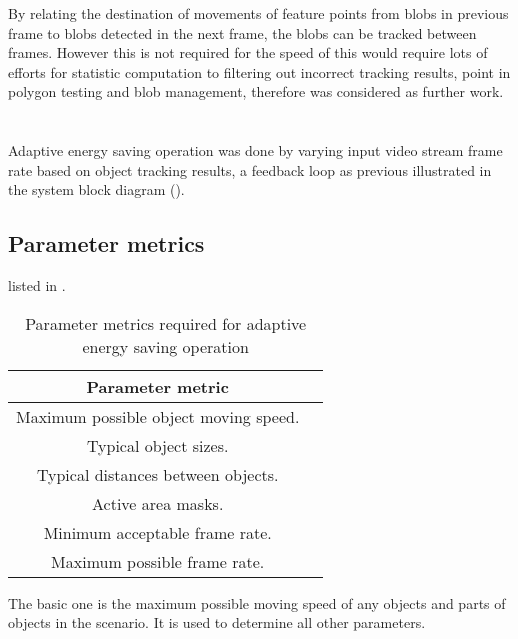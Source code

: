 By relating the destination of movements of feature points from blobs in previous frame to blobs detected in the next frame, the blobs can be tracked between frames. However this is not required for  the  speed of  this would  require lots of efforts for statistic computation to filtering out incorrect tracking results, point in polygon testing  and blob management, therefore was considered as further work.

\section{}

Adaptive energy saving operation was done by varying input video stream frame rate based on object tracking results, a feedback loop as previous illustrated in the system block diagram ().

\subsection{Parameter metrics}
\label{imp:ada:metric}

 listed in .

\begin{table}[H]
  \centering
  \begin{tabular}{cc}
  \toprule
  \textbf{Parameter metric} \\
  \midrule
  Maximum possible object moving speed. \\
  Typical object sizes. \\
  Typical distances between objects. \\
  Active area masks. \\
  Minimum acceptable frame rate. \\
  Maximum possible frame rate. \\
  \bottomrule
  \end{tabular}
  \caption{Parameter metrics required for adaptive energy saving operation}
  \label{imp:ada:par}
\end{table}

The basic one is the maximum possible moving speed of any objects and parts of objects in the scenario. It is used to determine all other parameters.

